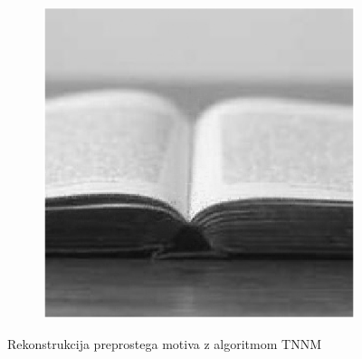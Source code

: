 \begin{figure}
\begin{subfigure}{0.325\linewidth}
    \end{subfigure}
    \hfill
    \begin{subfigure}{0.325\linewidth}
        \includegraphics[width=\linewidth]{Poglavja/Slike/preprosta grayscale 300/rez60TNNM.png}
    \end{subfigure}
    \caption{Rekonstrukcija preprostega motiva z algoritmom TNNM}
\end{figure}

